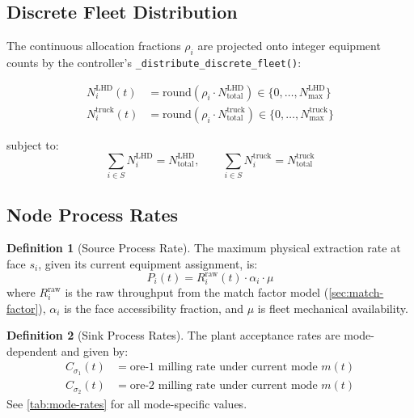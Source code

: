 \documentclass[11pt,a4paper]{article}
\theoremstyle{definition}
\newtheorem{definition}{Definition}[section]
\begin{document}
\subsection{Discrete Fleet Distribution}

The continuous allocation fractions $\rho_i$ are projected onto integer
equipment counts by the controller's \texttt{\_distribute\_discrete\_fleet()}:

\begin{align}
  N_i^{\text{LHD}}(t) &= \text{round}(\rho_i \cdot N^{\text{LHD}}_{\text{total}}) \in \{0, \ldots, N^{\text{LHD}}_{\max}\} \label{eq:lhd-alloc}\\
  N_i^{\text{truck}}(t) &= \text{round}(\rho_i \cdot N^{\text{truck}}_{\text{total}}) \in \{0, \ldots, N^{\text{truck}}_{\max}\} \label{eq:truck-alloc}
\end{align}

subject to:
\begin{equation}
  \sum_{i \in S} N_i^{\text{LHD}} = N^{\text{LHD}}_{\text{total}}, \qquad
  \sum_{i \in S} N_i^{\text{truck}} = N^{\text{truck}}_{\text{total}}
  \label{eq:fleet-conservation}
\end{equation}

\subsection{Node Process Rates}

\begin{definition}[Source Process Rate]
The maximum physical extraction rate at face $s_i$, given its current equipment
assignment, is:
\begin{equation}
  P_i(t) = R_i^{\text{raw}}(t) \cdot \alpha_i \cdot \mu
  \label{eq:source-rate}
\end{equation}
where $R_i^{\text{raw}}$ is the raw throughput from the match factor model
(\cref{sec:match-factor}), $\alpha_i$ is the face accessibility fraction,
and $\mu$ is fleet mechanical availability.
\end{definition}

\begin{definition}[Sink Process Rates]
The plant acceptance rates are mode-dependent and given by:
\begin{align}
  C_{\sigma_1}(t) &= \text{ore-1 milling rate under current mode } m(t) \\
  C_{\sigma_2}(t) &= \text{ore-2 milling rate under current mode } m(t)
\end{align}
See \cref{tab:mode-rates} for all mode-specific values.
\end{definition}
\end{document}
